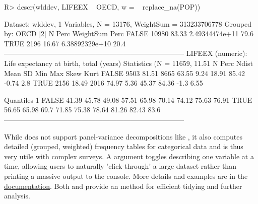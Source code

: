 \documentclass[article]{jss}
\newcommand{\fct}[1]{\code{#1()}}
\begin{document}
%
\begin{Schunk}
\begin{Sinput}
R> descr(wlddev, LIFEEX ~ OECD, w = ~ replace_na(POP))
\end{Sinput}
\begin{Soutput}
Dataset: wlddev, 1 Variables, N = 13176, WeightSum = 313233706778
Grouped by: OECD [2]
           N   Perc       WeightSum  Perc
FALSE  10980  83.33  2.49344474e+11  79.6
TRUE    2196  16.67  6.38892329e+10  20.4
-----------------------------------------------------------------------------
LIFEEX (numeric): Life expectancy at birth, total (years)
Statistics (N = 11659, 11.51% NAs)
          N   Perc  Ndist   Mean    SD    Min    Max   Skew  Kurt
FALSE  9503  81.51   8665  63.55  9.24  18.91  85.42  -0.74   2.8
TRUE   2156  18.49   2016  74.97  5.36  45.37  84.36   -1.3  6.55

Quantiles
          1%     5%    10%    25%    50%    75%    90%    95%    99%
FALSE  41.39  45.78  49.08  57.51  65.98  70.14  74.12  75.63  76.91
TRUE   56.65  65.98   69.7  71.85  75.38  78.64  81.26  82.43   83.6
-----------------------------------------------------------------------------
\end{Soutput}
\end{Schunk}

%
While \fct{descr} does not support panel-variance decompositions like \fct{qsu}, it also computes detailed (grouped, weighted) frequency tables for categorical data and is thus very utile with complex surveys. A  argument toggles describing one variable at a time, allowing users to naturally 'click-through' a large dataset rather than printing a massive output to the console. More details and examples are in the \href{https://sebkrantz.github.io/collapse/reference/descr.html}{documentation}. Both \fct{qsu} and \fct{descr} provide an  method for efficient tidying and further analysis. \newline
\end{document}

